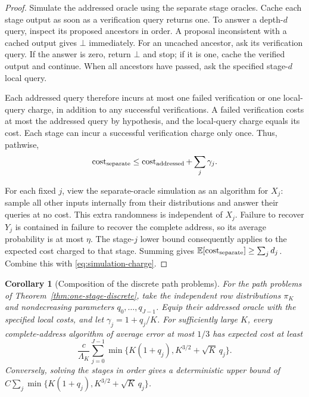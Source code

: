 \documentclass[11pt,a4paper]{article}
\newcommand{\E}{\mathbb E}
\newtheorem{corollary}[theorem]{Corollary}
\theoremstyle{definition}
\theoremstyle{remark}
\begin{document}
\begin{proof}
Simulate the addressed oracle using the separate stage oracles.  Cache each
stage output as soon as a verification query returns one.  To answer a
depth-$d$ query, inspect its proposed ancestors in order.  A proposal
inconsistent with a cached output gives $\bot$ immediately.  For an
uncached ancestor, ask its verification query.  If the answer is zero,
return $\bot$ and stop; if it is one, cache the verified output and continue.
When all ancestors have passed, ask the specified stage-$d$ local query.

Each addressed query therefore incurs at most one failed verification or
one local-query charge, in addition to any successful verifications.  A
failed verification costs at most the addressed query by hypothesis, and
the local-query charge equals its cost.  Each stage can incur a successful
verification charge only once.  Thus, pathwise,
\begin{equation}
 \operatorname{cost}_{\rm separate}
 \le\operatorname{cost}_{\rm addressed}+\sum_j\gamma_j.
 \label{eq:simulation-charge}
\end{equation}

For each fixed $j$, view the separate-oracle simulation as an algorithm for
$X_j$: sample all other inputs internally from their distributions and
answer their queries at no cost.  This extra randomness is independent of
$X_j$.  Failure to recover $Y_j$ is contained in failure to recover the
complete address, so its average probability is at most $\eta$.  The
stage-$j$ lower bound consequently applies to the expected cost charged
to that stage.  Summing gives
$\E[\operatorname{cost}_{\rm separate}]\ge\sum_jd_j$.
Combine this with \eqref{eq:simulation-charge}.
\end{proof}

\begin{corollary}[Composition of the discrete path problems]
\label{cor:abstract-macro-lower}
For the path problems of Theorem~\ref{thm:one-stage-discrete}, take the
independent row distributions $\pi_K$ and nondecreasing parameters
$q_0,\ldots,q_{J-1}$.  Equip their addressed oracle with the specified local
costs, and let $\gamma_j=1+q_j/K$.  For sufficiently large $K$, every
complete-address algorithm of average error at most $1/3$ has expected cost
at least
\[
 \frac{c}{\Lambda_K}\sum_{j=0}^{J-1}
 \min\{K(1+q_j),K^{3/2}+\sqrt K\,q_j\}.
\]
Conversely, solving the stages in order gives a deterministic upper bound
of $C\sum_j\min\{K(1+q_j),K^{3/2}+\sqrt K\,q_j\}$.
\end{corollary}
\end{document}
